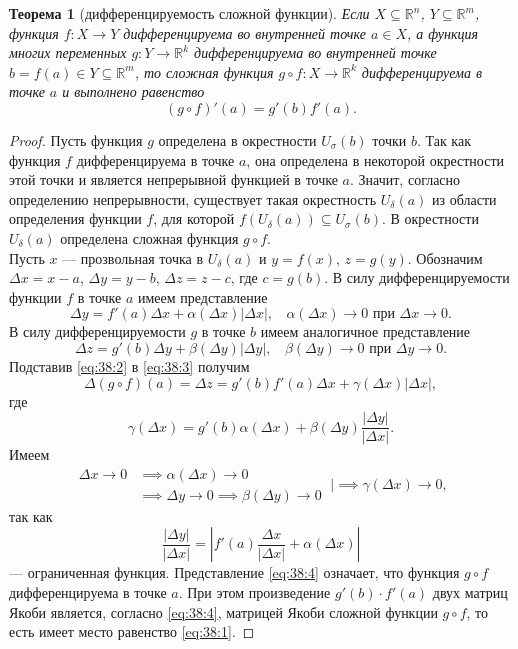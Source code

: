 \documentclass[12pt]{report}
\numberwithin{equation}{section}
\newtheorem{theorem}{Теорема}[section]
\begin{document}
\begin{theorem}[дифференцируемость сложной функции] \label{th:38:1}
Если $X \subseteq \mathbb{R}^n$, $Y \subseteq \mathbb{R}^m$, функция $f : X \to Y$ дифференцируема во внутренней точке $a \in X$, а функция многих переменных $g : Y \to \mathbb{R}^k$ дифференцируема во внутренней точке $b = f(a) \in Y \subseteq \mathbb{R}^m$, то сложная функция $g \circ f : X \to \mathbb{R}^k$ дифференцируема в точке $a$ и выполнено равенство
\begin{equation} \label{eq:38:1}
(g \circ f)'(a) = g'(b) f'(a).
\end{equation}
\end{theorem}

\begin{proof}
Пусть функция $g$ определена в окрестности $U_{\sigma}(b)$ точки $b$. Так как функция $f$ дифференцируема в точке $a$, она определена в некоторой окрестности этой точки и является непрерывной функцией в точке $a$. Значит, согласно определению непрерывности, существует такая окрестность $U_{\delta}(a)$ из области определения функции $f$, для которой $f(U_{\delta}(a))\subseteq U_{\sigma}(b)$. В окрестности $U_{\delta}(a)$ определена сложная функция $g \circ f$.\\

Пусть $x$ --- прозвольная точка в $U_{\delta}(a)$ и $y = f(x)$, $z = g(y)$. Обозначим $\Delta x = x-a$, $\Delta y = y - b$, $\Delta z = z - c$, где $ c = g(b)$. В силу дифференцируемости функции $f$ в точке $a$ имеем представление
\begin{equation} \label{eq:38:2}
\Delta y = f'(a) \Delta x + \alpha(\Delta x)|\Delta x|,~~~~ \alpha(\Delta x) \to 0 \text{ при } \Delta x \to 0.
\end{equation}
В силу дифференцируемости $g$ в точке $b$ имеем аналогичное представление
\begin{equation} \label{eq:38:3}
\Delta z = g'(b) \Delta y + \beta (\Delta y) |\Delta y|,~~~~ \beta(\Delta y) \to 0 \text{ при } \Delta y \to 0.
\end{equation}
Подставив \eqref{eq:38:2} в \eqref{eq:38:3} получим
\begin{equation} \label{eq:38:4}
\Delta (g \circ f) (a) = \Delta z = g'(b) f'(a) \Delta x + \gamma (\Delta x) |\Delta x|,
\end{equation}
где
\[\gamma(\Delta x) = g'(b) \alpha (\Delta x) + \beta (\Delta y) \frac{|\Delta y|}{|\Delta x|}.\]
Имеем
\[ \begin{aligned}
\Delta x \to 0 &\implies \alpha(\Delta x) \to 0\\
&\implies \Delta y \to 0 \implies \beta(\Delta y) \to 0~
\end{aligned} \biggr\vert \implies \gamma(\Delta x) \to 0,\]
так как
\[ \frac{|\Delta y|}{|\Delta x|} = \left| f'(a) \frac{\Delta x}{|\Delta x|} + \alpha(\Delta x) \right|\]
--- ограниченная функция. Представление \eqref{eq:38:4} означает, что функция $g \circ f$ дифференцируема в точке $a$. При этом произведение $g'(b) \cdot f'(a)$ двух матриц Якоби является, согласно \eqref{eq:38:4}, матрицей Якоби сложной функции $g \circ f$, то есть имеет место равенство \eqref{eq:38:1}.
\end{proof}
\end{document}
